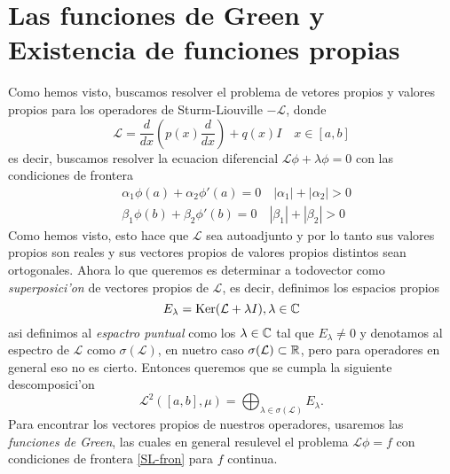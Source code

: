 \documentclass[main.tex]{subfiles}
\begin{document}
\section{Las funciones de Green y Existencia de funciones propias}
\noindent Como hemos visto, buscamos resolver el problema de vetores propios y valores propios para los operadores de Sturm-Liouville $-\mathcal{L}$, donde
\begin{equation}\label{SL-eq}
  \mathcal{L}=\dfrac{d}{dx}\left(p(x)\dfrac{d}{dx}\right)+q(x)I\quad x\in[a,b]
\end{equation}
es decir, buscamos resolver la ecuacion diferencial $\mathcal{L}\phi+\lambda\phi=0$ con las condiciones de frontera
\begin{eqnarray}\label{SL-fron}
  &\alpha_{1}\phi(a)+\alpha_{2}\phi'(a)=0\quad|\alpha_{1}|+|\alpha_{2}|>0\\
  &\beta_{1}\phi(b)+\beta_{2}\phi'(b)=0\quad|\beta_{1}|+|\beta_{2}|>0
\end{eqnarray}
Como hemos visto, esto hace que $\mathcal{L}$ sea autoadjunto y por lo tanto sus valores propios son reales y sus vectores propios de valores propios distintos sean ortogonales. Ahora lo que queremos es determinar a todovector como \emph{superposici'on} de vectores propios de $\mathcal{L}$, es decir, definimos los espacios propios
\[
  E_{\lambda}=\mathrm{Ker}(\mathcal{L}+\lambda I),\lambda\in\mathbb C 
\]
asi definimos al \emph{espactro puntual} como los $\lambda\in\mathbb C $ tal que $E_{\lambda}\neq 0$ y denotamos al espectro de $\mathcal{L}$ como $\sigma(\mathcal{L})$, en nuetro caso $\sigma(\mathcal{L})\subset\mathbb R $, pero para operadores en general eso no es cierto. Entonces queremos que se cumpla la siguiente descomposici'on
\[
  \mathcal{L}^{2}([a,b],\mu)=\bigoplus_{\lambda\in\sigma(\mathcal{L})}E_{\lambda}.
\]
Para encontrar los vectores propios de nuestros operadores, usaremos las \emph{funciones de Green}, las cuales en general resulevel el problema $\mathcal{L}\phi=f$ con condiciones de frontera \ref{SL-fron} para $f$ continua.
\end{document}
